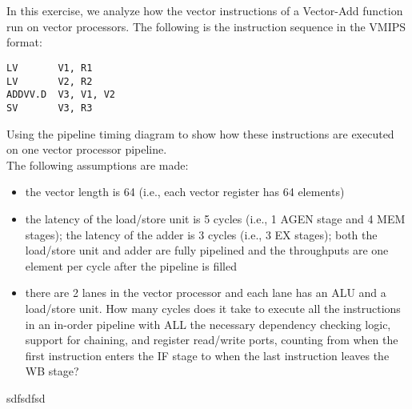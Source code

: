 \documentclass[11pt]{article}
\begin{document}
\section{}

In this exercise, we analyze how the vector instructions of a Vector-Add function run on vector processors. The following is the instruction sequence in the VMIPS format:
\begin{verbatim}
LV       V1, R1
LV       V2, R2
ADDVV.D  V3, V1, V2
SV       V3, R3
\end{verbatim}

Using the pipeline timing diagram to show how these instructions are executed on one vector processor pipeline. \\

The following assumptions are made: 
\begin{itemize}
	\item the vector length is 64 (i.e., each vector register has 64 elements)
	\item the latency of the load/store unit is 5 cycles (i.e., 1 AGEN stage and 4 MEM stages); the latency of the adder is 3 cycles (i.e., 3 EX stages); both the load/store unit and adder are fully pipelined and the throughputs are one element per cycle after the pipeline is filled
	\item there are 2 lanes in the vector processor and each lane has an ALU and a load/store unit. How many cycles does it take to execute all the instructions in an in-order pipeline with ALL the necessary dependency checking logic, support for chaining, and register read/write ports, counting from when the first instruction enters the IF stage to when the last instruction leaves the WB stage?
\end{itemize}

\begin{Answer}
sdfsdfsd
\end{Answer}

\section{}
\end{document}
